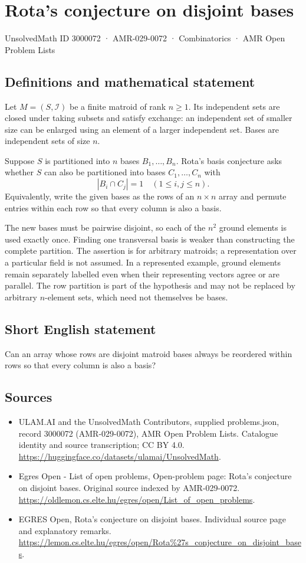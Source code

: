 \documentclass[11pt,a4paper]{article}
\begin{document}
\section*{Rota's conjecture on disjoint bases}\label{3000072}
{\small UnsolvedMath ID 3000072 · AMR-029-0072 · Combinatorics · AMR Open Problem Lists}
\subsection{Definitions and mathematical statement}
Let $M=(S,\mathcal I)$ be a finite matroid of rank $n\ge1$.
Its independent sets are closed under taking subsets and satisfy
exchange: an independent set of smaller size can be enlarged using
an element of a larger independent set. Bases are independent
sets of size $n$.

Suppose $S$ is partitioned into $n$ bases $B_1,\ldots,B_n$.
Rota's basis conjecture asks whether $S$ can also be partitioned
into bases $C_1,\ldots,C_n$ with
\[
                              |B_i\cap C_j|=1
                                     \quad(1\le i,j\le n).
\]
Equivalently, write the given bases as the rows of an $n\times n$
array and permute entries within each row so that every column is
also a basis.

The new bases must be pairwise disjoint, so each of the $n^2$
ground elements is used exactly once. Finding one transversal
basis is weaker than constructing the complete partition.
The assertion is for arbitrary matroids; a representation over
a particular field is not assumed. In a represented example,
ground elements remain separately labelled even when their
representing vectors agree or are parallel. The row partition
is part of the hypothesis and may not be replaced by arbitrary
$n$-element sets, which need not themselves be bases.
\subsection{Short English statement}
Can an array whose rows are disjoint matroid bases always be
reordered within rows so that every column is also a basis?
\subsection{Sources}
\begin{itemize}
\item[S1] ULAM.AI and the UnsolvedMath Contributors, supplied problems.json, record 3000072 (AMR-029-0072), AMR Open Problem Lists. Catalogue identity and source transcription; CC BY 4.0.
\url{https://huggingface.co/datasets/ulamai/UnsolvedMath}.
\item[S2] Egres Open - List of open problems, Open-problem page: Rota's conjecture on disjoint bases. Original source indexed by AMR-029-0072.
\url{https://oldlemon.cs.elte.hu/egres/open/List_of_open_problems}.
\item[S3] EGRES Open, Rota's conjecture on disjoint bases. Individual source page and explanatory remarks.
\url{https://lemon.cs.elte.hu/egres/open/Rota%27s_conjecture_on_disjoint_bases}.
\end{itemize}
\end{document}
